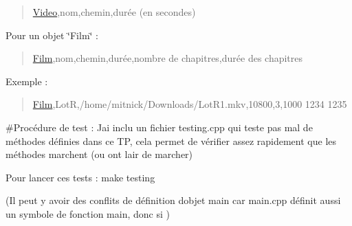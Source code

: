 \begin{quote}
\hyperlink{classVideo}{Video},nom,chemin,durée (en secondes) \end{quote}



\begin{DoxyItemize}
\item Pour un objet \char`\"{}\+Film\char`\"{} \+:
\end{DoxyItemize}

\begin{quote}
\hyperlink{classFilm}{Film},nom,chemin,durée,nombre de chapitres,durée des chapitres \end{quote}


Exemple \+:

\begin{quote}
\hyperlink{classFilm}{Film},LotR,/home/mitnick/\+Downloads/\+Lot\+R1.mkv,10800,3,1000 1234 1235 \end{quote}


\#\+Procédure de test \+: J\textquotesingle{}ai inclu un fichier {\ttfamily testing.\+cpp} qui teste pas mal de méthodes définies dans ce TP, cela permet de vérifier assez rapidement que les méthodes marchent (ou ont l\textquotesingle{}air de marcher)

Pour lancer ces tests \+: {\ttfamily make testing}

(Il peut y avoir des conflits de définition d\textquotesingle{}objet {\ttfamily main} car {\ttfamily main.\+cpp} définit aussi un symbole de fonction {\ttfamily main}, donc si ) 